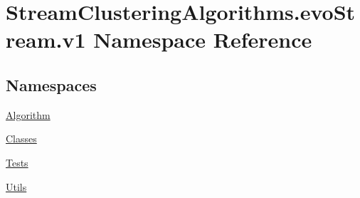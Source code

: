 \hypertarget{namespaceStreamClusteringAlgorithms_1_1evoStream_1_1v1}{}\section{Stream\+Clustering\+Algorithms.\+evo\+Stream.\+v1 Namespace Reference}
\label{namespaceStreamClusteringAlgorithms_1_1evoStream_1_1v1}
\subsection*{Namespaces}
\begin{DoxyCompactItemize}
\item 
 \hyperlink{namespaceStreamClusteringAlgorithms_1_1evoStream_1_1v1_1_1Algorithm}{Algorithm}
\item 
 \hyperlink{namespaceStreamClusteringAlgorithms_1_1evoStream_1_1v1_1_1Classes}{Classes}
\item 
 \hyperlink{namespaceStreamClusteringAlgorithms_1_1evoStream_1_1v1_1_1Tests}{Tests}
\item 
 \hyperlink{namespaceStreamClusteringAlgorithms_1_1evoStream_1_1v1_1_1Utils}{Utils}
\end{DoxyCompactItemize}
